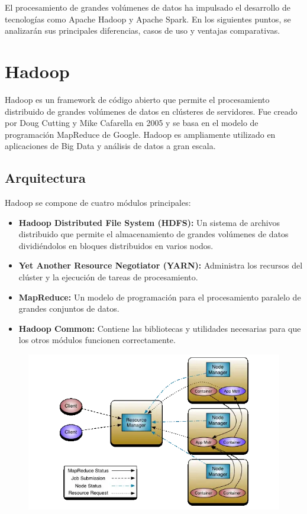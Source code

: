 \documentclass[12pt]{article}
\begin{document}
El procesamiento de grandes volúmenes de datos ha impulsado el desarrollo de tecnologías como Apache Hadoop y Apache Spark. En los siguientes
puntos, se analizarán sus principales diferencias, casos de uso y ventajas comparativas.

\section{Hadoop}

Hadoop es un framework de código abierto que permite el procesamiento distribuido de grandes volúmenes de datos en clústeres de servidores. 
Fue creado por Doug Cutting y Mike Cafarella en 2005 y se basa en el modelo de programación MapReduce de Google. Hadoop es ampliamente utilizado en aplicaciones de Big Data y análisis de datos a gran escala.

\subsection{Arquitectura}
Hadoop se compone de cuatro módulos principales:
\begin{itemize}
    \item \textbf{Hadoop Distributed File System (HDFS):} Un sistema de archivos distribuido que permite el almacenamiento de grandes volúmenes de datos dividiéndolos en bloques distribuidos en varios nodos.
    \item \textbf{Yet Another Resource Negotiator (YARN):} Administra los recursos del clúster y la ejecución de tareas de procesamiento.
    \item \textbf{MapReduce:} Un modelo de programación para el procesamiento paralelo de grandes conjuntos de datos.
    \item \textbf{Hadoop Common:} Contiene las bibliotecas y utilidades necesarias para que los otros módulos funcionen correctamente.
\end{itemize}

\begin{figure}[h!]
    \centering
    \includegraphics[width=.7\textwidth]{esquema-hadoop.png}
    \label{fig:my_label}
\end{figure}
\end{document}
